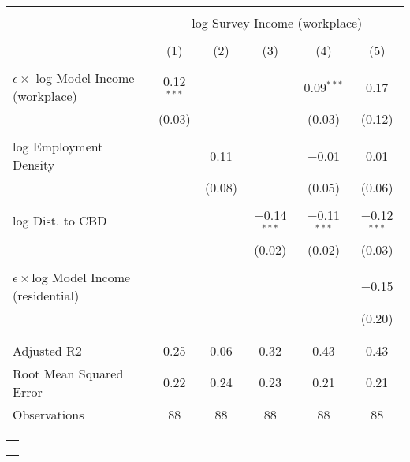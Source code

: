 
\begin{tabular}{@{\extracolsep{5pt}}lccccc} 
\toprule  
\\[-1.8ex] & \multicolumn{5}{c}{log Survey Income (workplace)} \\ 
\\[-1.8ex] & (1) & (2) & (3) & (4) & (5)\\ 
\addlinespace  \\[-1.8ex] 
  $\epsilon \times $ log Model Income (workplace) & 0.12$^{***}$ &  &  & 0.09$^{***}$ & 0.17 \\ 
  & (0.03) &  &  & (0.03) & (0.12) \\ 
  & & & & & \\ 
 log Employment Density &  & 0.11 &  & $-$0.01 & 0.01 \\ 
  &  & (0.08) &  & (0.05) & (0.06) \\ 
  & & & & & \\ 
 log Dist. to CBD &  &  & $-$0.14$^{***}$ & $-$0.11$^{***}$ & $-$0.12$^{***}$ \\ 
  &  &  & (0.02) & (0.02) & (0.03) \\ 
  & & & & & \\ 
  $\epsilon \times $log Model Income (residential) &  &  &  &  & $-$0.15 \\ 
  &  &  &  &  & (0.20) \\ 
  & & & & & \\ 
\addlinespace  \\[-1.8ex] 
Adjusted R2 & 0.25 & 0.06 & 0.32 & 0.43 & 0.43 \\ 
Root Mean Squared Error & 0.22 & 0.24 & 0.23 & 0.21 & 0.21 \\ 
Observations & 88 & 88 & 88 & 88 & 88 \\ 
\bottomrule  
\end{tabular} 

\begin{tabular}{@{\extracolsep{5pt}} c} 
\\[-1.8ex]\addlinespace  
\addlinespace  \\[-1.8ex] 
 \\ 
\addlinespace  \\[-1.8ex] 
\end{tabular} 
